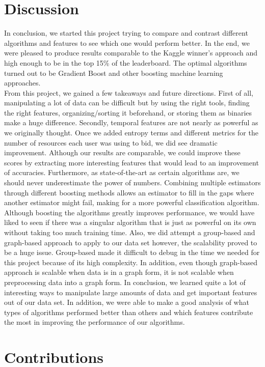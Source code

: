 \documentclass{article} %
\begin{document}
\section{Discussion}
In conclusion, we started this project trying to compare and contrast different algorithms and features to see which one would perform better. In the end, we were pleased to produce results comparable to the Kaggle winner's approach and high enough to be in the top 15\% of the leaderboard. The optimal algorithms turned out to be Gradient Boost and other boosting machine learning approaches. \\

From this project, we gained a few takeaways and future directions. First of all, manipulating a lot of data can be difficult but by using the right tools, finding the right features, organizing/sorting it beforehand, or storing them as binaries make a huge difference. Secondly, temporal features are not nearly as powerful as we originally thought. Once we added entropy terms and different metrics for the number of resources each user was using to bid, we did see dramatic improvement. Although our results are comparable, we could improve these scores by extracting more interesting features that would lead to an improvement of accuracies. Furthermore, as state-of-the-art as certain algorithms are, we should never underestimate the power of numbers. Combining multiple estimators through different boosting methods allows an estimator to fill in the gaps where another estimator might fail, making for a more powerful classification algorithm. Although boosting the algorithms greatly improves performance, we would have liked to seen if there was a singular algorithm that is just as powerful on its own without taking too much training time. Also, we did attempt a group-based and graph-based approach to apply to our data set however, the scalability proved to be a huge issue. Group-based made it difficult to debug in the time we needed for this project because of its high complexity. In addition, even though graph-based approach is scalable when data is in a graph form, it is not scalable when preprocessing data into a graph form. In conclusion, we learned quite a lot of interesting ways to manipulate large amounts of data and get important features out of our data set. In addition, we were able to make a good analysis of what types of algorithms performed better than others and which features contribute the most in improving the performance of our algorithms.

\section{Contributions}
\end{document}
